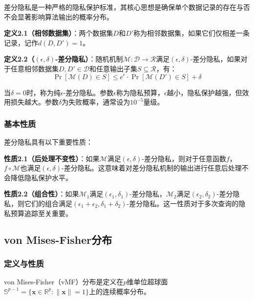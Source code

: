\documentclass[a4paper,12pt]{article}
\begin{document}
差分隐私是一种严格的隐私保护标准，其核心思想是确保单个数据记录的存在与否不会显著影响算法输出的概率分布。

\textbf{定义2.1（相邻数据集）}：两个数据集$D$和$D'$称为相邻数据集，如果它们仅相差一条记录，记作$d(D, D') = 1$。

\textbf{定义2.2（$(\epsilon, \delta)$-差分隐私）}：随机机制$\mathcal{M}: \mathcal{D} \rightarrow \mathcal{R}$满足$(\epsilon, \delta)$-差分隐私，如果对于任意相邻数据集$D, D' \in \mathcal{D}$和任意输出子集$S \subseteq \mathcal{R}$，有：
\begin{equation}
\Pr[\mathcal{M}(D) \in S] \leq e^\epsilon \cdot \Pr[\mathcal{M}(D') \in S] + \delta
\end{equation}

当$\delta = 0$时，称为纯$\epsilon$-差分隐私。参数$\epsilon$称为隐私预算，$\epsilon$越小，隐私保护越强，但效用损失越大。参数$\delta$为失败概率，通常设为$10^{-5}$量级。

\subsubsection{基本性质}

差分隐私具有以下重要性质：

\textbf{性质2.1（后处理不变性）}：如果$\mathcal{M}$满足$(\epsilon, \delta)$-差分隐私，则对于任意函数$f$，$f \circ \mathcal{M}$也满足$(\epsilon, \delta)$-差分隐私。这意味着对差分隐私机制的输出进行任意后处理不会降低隐私保护水平。

\textbf{性质2.2（组合性）}：如果$\mathcal{M}_1$满足$(\epsilon_1, \delta_1)$-差分隐私，$\mathcal{M}_2$满足$(\epsilon_2, \delta_2)$-差分隐私，则它们的组合满足$(\epsilon_1 + \epsilon_2, \delta_1 + \delta_2)$-差分隐私。这一性质对于多次查询的隐私预算追踪至关重要。

\subsection{von Mises-Fisher分布}

\subsubsection{定义与性质}

von Mises-Fisher（vMF）分布是定义在$p$维单位超球面$\mathbb{S}^{p-1} = \{\mathbf{x} \in \mathbb{R}^p : \|\mathbf{x}\| = 1\}$上的连续概率分布。
\end{document}
